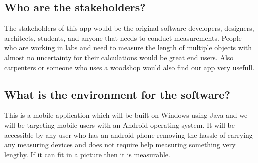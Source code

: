 \documentclass{article}
\begin{document}
\subsection{Who are the stakeholders?}
The stakeholders of this app would be the original software developers, designers, architects, students, and anyone that needs to conduct measurements. People who are working in labs and need to measure the length of multiple objects with almost no uncertainty for their calculations would be great end users. Also carpenters or someone who uses a woodshop would also find our app very usefull. 
\subsection{What is the environment for the software?}
This is a mobile application which will be built on Windows using Java and we will be targeting mobile users with an Android operating system. It will be accessible by any user who has an android phone removing the hassle of carrying any measuring devices and does not require help measuring something very lengthy. If it can fit in a picture then it is measurable.
\end{document}
